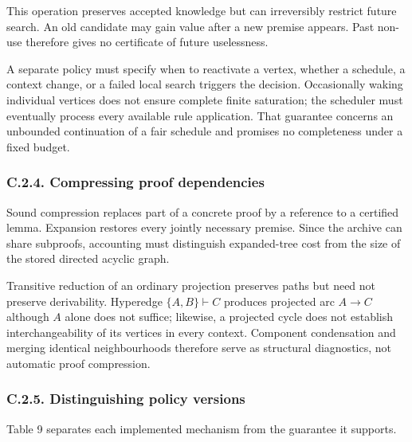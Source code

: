 \documentclass[pdflatex,sn-basic,Numbered]{sn-jnl}
\begin{document}
This operation preserves accepted knowledge but can irreversibly restrict future search. An old candidate may gain value after a new premise appears. Past non-use therefore gives no certificate of future uselessness.

A separate policy must specify when to reactivate a vertex, whether a schedule, a context change, or a failed local search triggers the decision. Occasionally waking individual vertices does not ensure complete finite saturation; the scheduler must eventually process every available rule application. That guarantee concerns an unbounded continuation of a fair schedule and promises no completeness under a fixed budget.

\subsubsection*{C.2.4. Compressing proof dependencies}\label{c.2.4.-compressing-proof-dependencies}

Sound compression replaces part of a concrete proof by a reference to a certified lemma. Expansion restores every jointly necessary premise. Since the archive can share subproofs, accounting must distinguish expanded-tree cost from the size of the stored directed acyclic graph.

Transitive reduction of an ordinary projection preserves paths but need not preserve derivability. Hyperedge \(\{ A,B\} \vdash C\) produces projected arc \(A \rightarrow C\) although \(A\) alone does not suffice; likewise, a projected cycle does not establish interchangeability of its vertices in every context. Component condensation and merging identical neighbourhoods therefore serve as structural diagnostics, not automatic proof compression.

\subsubsection*{C.2.5. Distinguishing policy versions}\label{c.2.5.-distinguishing-policy-versions}

Table 9 separates each implemented mechanism from the guarantee it supports.

\begingroup
\small
\setlength{\tabcolsep}{3pt}
\renewcommand{\arraystretch}{1.13}
\end{document}
